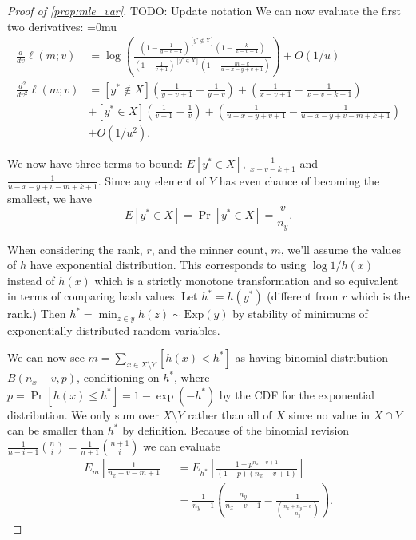 \begin{proof}[Proof of \cref{prop:mle_var}]
   TODO: Update notation
   We can now evaluate the first two derivatives:
   {
      \thinmuskip=0mu
   \begin{align}
      \frac{d}{dv}\ell(m;v)&=
      \log\left(\frac{(1-\frac1{y-v+1})^{[y^*\not\in X]}(1-\frac{k}{x-v+1})}{(1-\frac 1{v+1})^{[y^*\in X]}(1-\frac{m-k}{u-x-y+v+1})}\right) + O(1/u)
      \label{eq:deriv1}
      \\
      \frac{d^2}{dv^2}\ell(m;v)&=
       [y^*\not\in X](\tfrac1{y-v+1}-\tfrac1{y-v})
      + (\tfrac1{x-v+1}-\tfrac1{x-v-k+1})
                               \\&
                               +[y^*\in X](\tfrac1{v+1}-\tfrac1{v})
      + (\tfrac1{u-x-y+v+1}-\tfrac1{u-x-y+v-m+k+1}) \\&+ O(1/u^2)
      \label{eq:deriv2}
      .
   \end{align}
   \vspace{-1em}
   }

   We now have three terms to bound:
   $E[y^* \in X]$, $\tfrac1{x-v-k+1}$ and $\tfrac1{u-x-y+v-m+k+1}$.
   Since any element of $Y$ has even chance of becoming the smallest, we have 
   \[E[y^*\in X] = \Pr[y^*\in X] = \frac{v}{n_y}. \]

   When considering the rank, $r$, and the minner count, $m$, we'll assume the values of $h$ have exponential distribution.
   This corresponds to using $\log1/h(x)$ instead of $h(x)$ which is a strictly monotone transformation and so equivalent in terms of comparing hash values.
   Let $h^* = h(y^*)$ (different from $r$ which is the rank.)
   Then $h^* = \min_{z\in y}h(z) \sim \text{Exp}(y)$ by stability of minimums of exponentially distributed random variables.

   We can now see $m=\sum_{x\in X\setminus Y} [h(x) < h^*]$ as having binomial distribution $B(n_x-v, p)$, conditioning on $h^*$, where $p=\Pr[h(x)\le h^*] = 1-\exp(-h^*)$ by the CDF for the exponential distribution.
   We only sum over $X\setminus Y$ rather than all of $X$ since no value in $X\cap Y$ can be smaller than $h^*$ by definition.
   Because of the binomial revision
   $\frac1{n-i+1}\binom{n}{i} = \frac1{n+1}\binom{n+1}{i}$
   we can evaluate
   \begin{align}
      E_m\left[\tfrac1{n_x-v-m+1}\right]
      &= E_{h^*}\left[\tfrac{1-p^{n_x-v+1}}{(1-p)(n_x-v+1)}\right]
    \\&= \tfrac1{n_y-1}\left(\tfrac{n_y}{n_x-v+1} - \tfrac1{\binom{n_x+n_y-v}{n_y}}\right).
   \end{align}


\end{proof}
